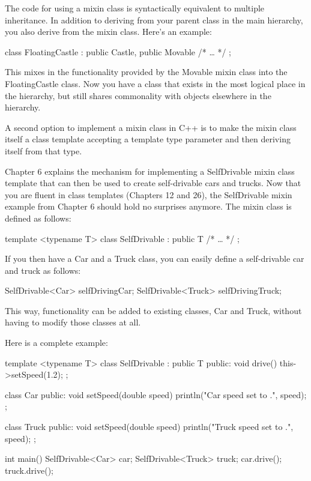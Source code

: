 
The code for using a mixin class is syntactically equivalent to multiple inheritance. In addition to deriving from your parent class in the main hierarchy, you also derive from the mixin class. Here’s an example:

\begin{cpp}
class FloatingCastle : public Castle, public Movable { /* … */ };
\end{cpp}

This mixes in the functionality provided by the Movable mixin class into the FloatingCastle class. Now you have a class that exists in the most logical place in the hierarchy, but still shares commonality with objects elsewhere in the hierarchy.


A second option to implement a mixin class in C++ is to make the mixin class itself a class template accepting a template type parameter and then deriving itself from that type.

Chapter 6 explains the mechanism for implementing a SelfDrivable mixin class template that can then be used to create self-drivable cars and trucks. Now that you are fluent in class templates (Chapters 12 and 26), the SelfDrivable mixin example from Chapter 6 should hold no surprises anymore. The mixin class is defined as follows:

\begin{cpp}
template <typename T>
class SelfDrivable : public T { /* … */ };
\end{cpp}

If you then have a Car and a Truck class, you can easily define a self-drivable car and truck as follows:

\begin{cpp}
SelfDrivable<Car> selfDrivingCar;
SelfDrivable<Truck> selfDrivingTruck;
\end{cpp}

This way, functionality can be added to existing classes, Car and Truck, without having to modify those classes at all.

Here is a complete example:

\begin{cpp}
template <typename T>
class SelfDrivable : public T
{
    public:
        void drive() { this->setSpeed(1.2); }
};

class Car
{
    public:
        void setSpeed(double speed) { println("Car speed set to {}.", speed); }
};

class Truck
{
    public:
        void setSpeed(double speed) { println("Truck speed set to {}.", speed); }
};

int main()
{
    SelfDrivable<Car> car;
    SelfDrivable<Truck> truck;
    car.drive();
    truck.drive();
}
\end{cpp}


